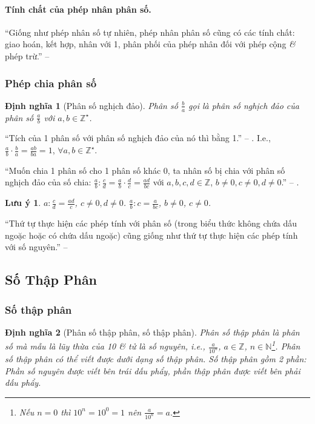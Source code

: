 \documentclass{article}
\numberwithin{equation}{section}
\newtheorem{definition}{Định nghĩa}[section]
\newtheorem{remark}{Lưu ý}[section]
\begin{document}
\paragraph{Tính chất của phép nhân phân số.} ``Giống như phép nhân số tự nhiên, phép nhân phân số cũng có các tính chất: giao hoán, kết hợp, nhân với 1, phân phối của phép nhân đối với phép cộng \textit{\&} phép trừ.'' -- \cite[p. 41]{Thai_Anh_Dat_Ha_Loan_Nam_Quang_Toan_6_tap_2}

\subsubsection{Phép chia phân số}
 
\begin{definition}[Phân số nghịch đảo]
	Phân số $\frac{b}{a}$ gọi là \emph{phân số nghịch đảo} của phân số $\frac{a}{b}$ với $a,b\in\mathbb{Z}^\star$.
\end{definition}
``Tích của 1 phân số với phân số nghịch đảo của nó thì bằng 1.'' -- \cite[p. 42]{Thai_Anh_Dat_Ha_Loan_Nam_Quang_Toan_6_tap_2}. I.e., $\frac{a}{b}\cdot\frac{b}{a} = \frac{ab}{ba} = 1$, $\forall a,b\in\mathbb{Z}^\star$.

``Muốn chia 1 phân số cho 1 phân số khác 0, ta nhân số bị chia với phân số nghịch đảo của số chia: $\frac{a}{b}:\frac{c}{d} = \frac{a}{b}\cdot\frac{d}{c} = \frac{ad}{bc}$ với $a,b,c,d\in\mathbb{Z}$, $b\ne 0,c\ne 0,d\ne 0$.'' -- \cite[p. 42]{Thai_Anh_Dat_Ha_Loan_Nam_Quang_Toan_6_tap_2}.

\begin{remark}
	$a:\frac{c}{d} = \frac{ad}{c}$, $c\ne 0,d\ne 0$. $\frac{a}{b}:c = \frac{a}{bc}$, $b\ne 0$, $c\ne 0$.
\end{remark}
``Thứ tự thực hiện các phép tính với phân số (trong biểu thức không chứa dấu ngoặc hoặc có chứa dấu ngoặc) cũng giống như thứ tự thực hiện các phép tính với số nguyên.'' -- \cite[p. 42]{Thai_Anh_Dat_Ha_Loan_Nam_Quang_Toan_6_tap_2}

\subsection{Số Thập Phân}

\subsubsection{Số thập phân}

\begin{definition}[Phân số thập phân, số thập phân]
	\emph{Phân số thập phân} là phân số mà mẫu là lũy thừa của 10 \textit{\&} tử là số nguyên, i.e., $\frac{a}{10^n}$, $a\in\mathbb{Z}$, $n\in\mathbb{N}$\footnote{Nếu $n = 0$ thì $10^n = 10^0 = 1$ nên $\frac{a}{10^n} = a$.}. Phân số thập phân có thể viết được dưới dạng số thập phân. Số thập phân gồm 2 phần: \emph{Phần số nguyên} được viết bên trái dấu phẩy, \emph{phần thập phân} được viết bên phải dấu phẩy.
\end{definition}
\end{document}
